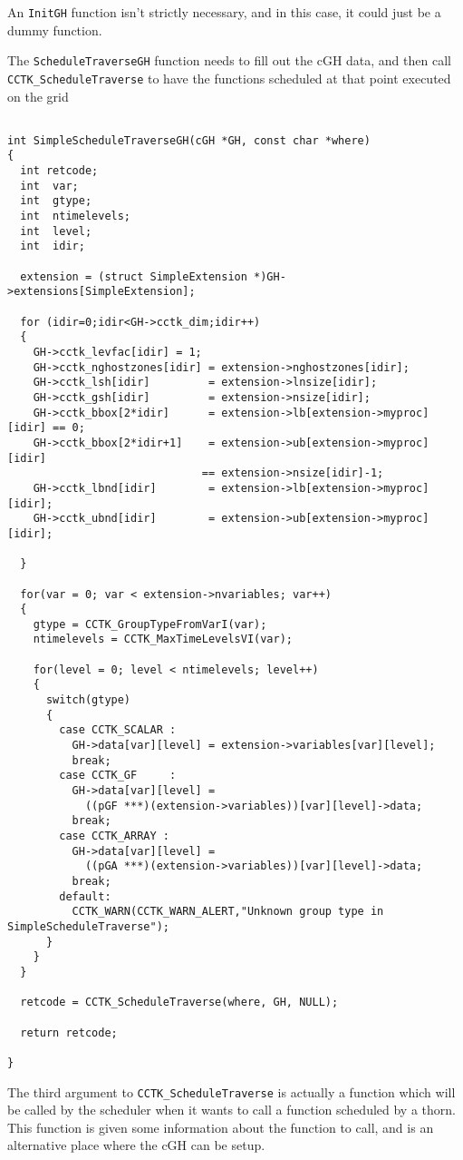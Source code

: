 An {\tt InitGH} function isn't strictly necessary, and in this case, it could
just be a dummy function.

The {\tt ScheduleTraverseGH} function needs to fill out the cGH data, and
then call {\tt CCTK\_ScheduleTraverse} to have the functions scheduled at
that point executed on the grid

\begin{verbatim}

int SimpleScheduleTraverseGH(cGH *GH, const char *where)
{
  int retcode;
  int  var;
  int  gtype;
  int  ntimelevels;
  int  level;
  int  idir;

  extension = (struct SimpleExtension *)GH->extensions[SimpleExtension];

  for (idir=0;idir<GH->cctk_dim;idir++)
  {
    GH->cctk_levfac[idir] = 1;
    GH->cctk_nghostzones[idir] = extension->nghostzones[idir];
    GH->cctk_lsh[idir]         = extension->lnsize[idir];
    GH->cctk_gsh[idir]         = extension->nsize[idir];
    GH->cctk_bbox[2*idir]      = extension->lb[extension->myproc][idir] == 0;
    GH->cctk_bbox[2*idir+1]    = extension->ub[extension->myproc][idir]
                              == extension->nsize[idir]-1;
    GH->cctk_lbnd[idir]        = extension->lb[extension->myproc][idir];
    GH->cctk_ubnd[idir]        = extension->ub[extension->myproc][idir];

  }

  for(var = 0; var < extension->nvariables; var++)
  {
    gtype = CCTK_GroupTypeFromVarI(var);
    ntimelevels = CCTK_MaxTimeLevelsVI(var);

    for(level = 0; level < ntimelevels; level++)
    {
      switch(gtype)
      {
        case CCTK_SCALAR :
          GH->data[var][level] = extension->variables[var][level];
          break;
        case CCTK_GF     :
          GH->data[var][level] =
            ((pGF ***)(extension->variables))[var][level]->data;
          break;
        case CCTK_ARRAY :
          GH->data[var][level] =
            ((pGA ***)(extension->variables))[var][level]->data;
          break;
        default:
          CCTK_WARN(CCTK_WARN_ALERT,"Unknown group type in SimpleScheduleTraverse");
      }
    }
  }

  retcode = CCTK_ScheduleTraverse(where, GH, NULL);

  return retcode;

}

\end{verbatim}

The third argument to {\tt CCTK\_ScheduleTraverse} is actually a function
which will be called by the scheduler when it wants to call a function
scheduled by a thorn.  This function is given some information about
the function to call, and is an alternative place where the cGH can be setup.

